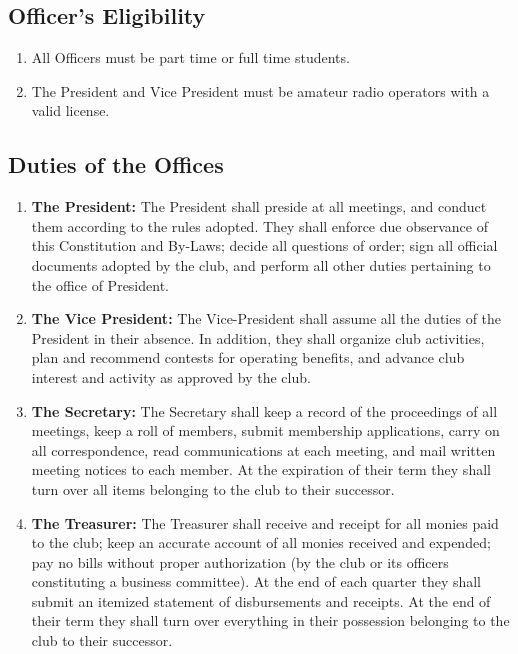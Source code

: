 \documentclass[a4paper,12pt]{article}
\begin{document}
\subsection{Officer's Eligibility}
\begin{enumerate}
  \item All Officers must be part time or full time students.
  \item The President and Vice President must be amateur radio operators with a valid license.
\end{enumerate}

\subsection{Duties of the Offices}
\begin{enumerate}
  \item \textbf{The President:} The President shall preside at all meetings, and conduct them according to the rules adopted. They shall enforce due observance of this Constitution and By-Laws; decide all questions of order; sign all official documents adopted by the club, and perform all other duties pertaining to the office of President.
  \item \textbf{The Vice President:} The Vice-President shall assume all the duties of the President in their absence. In addition, they shall organize club activities, plan and recommend contests for operating benefits, and advance club interest and activity as approved by the club.
  \item \textbf{The Secretary:} The Secretary shall keep a record of the proceedings of all meetings, keep a roll of members, submit
membership applications, carry on all correspondence, read communications at each meeting, and
mail written meeting notices to each member. At the expiration of their term they shall turn over
all items belonging to the club to their successor.
  \item \textbf{The Treasurer:} The Treasurer shall receive and receipt for all monies paid to the club; keep an accurate account of
all monies received and expended; pay no bills without proper authorization (by the club or its officers
constituting a business committee). At the end of each quarter they shall submit an itemized
statement of disbursements and receipts. At the end of their term they shall turn over everything
in their possession belonging to the club to their successor.
\end{enumerate}
\end{document}
